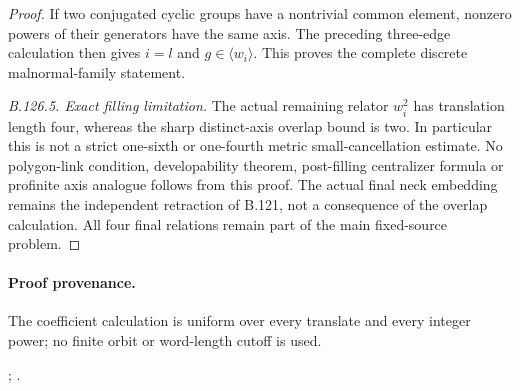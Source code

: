 \begin{proof}
If two conjugated cyclic groups have a nontrivial common element,
nonzero powers of their generators have the same axis. The preceding
three-edge calculation then gives $i=l$ and
$g\in\langle w_i\rangle$. This proves the complete discrete
malnormal-family statement.

\emph{B.126.5. Exact filling limitation.}
The actual remaining relator $w_i^2$ has translation length four,
whereas the sharp distinct-axis overlap bound is two. In particular
this is not a strict one-sixth or one-fourth metric small-cancellation
estimate. No polygon-link condition, developability theorem,
post-filling centralizer formula or profinite axis analogue follows
from this proof. The actual final neck embedding remains the
independent retraction of B.121, not a consequence of the overlap
calculation. All four final relations remain part of the main
fixed-source problem.
\end{proof}

\paragraph{Proof provenance.}
The coefficient calculation is uniform over every translate and every
integer power; no finite orbit or word-length cutoff is used.
\begingroup\raggedright
{};
.
\par\endgroup
